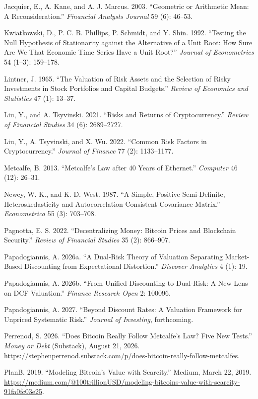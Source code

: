 \documentclass[12pt]{article}
\DeclareRobustCommand{\chg}[1]{{\color{blue}#1}}
\theoremstyle{plain}
\theoremstyle{remark}
\begin{document}
\chg{Jacquier, E., A. Kane, and A. J. Marcus. 2003. ``Geometric or Arithmetic Mean: A Reconsideration.'' \emph{Financial Analysts Journal} 59 (6): 46--53.}

\chg{Kwiatkowski, D., P. C. B. Phillips, P. Schmidt, and Y. Shin. 1992. ``Testing the Null Hypothesis of Stationarity against the Alternative of a Unit Root: How Sure Are We That Economic Time Series Have a Unit Root?'' \emph{Journal of Econometrics} 54 (1--3): 159--178.}

Lintner, J. 1965. ``The Valuation of Risk Assets and the Selection of Risky Investments in Stock Portfolios and Capital Budgets.'' \emph{Review of Economics and Statistics} 47 (1): 13--37.

\chg{Liu, Y., and A. Tsyvinski. 2021. ``Risks and Returns of Cryptocurrency.'' \emph{Review of Financial Studies} 34 (6): 2689--2727.}

\chg{Liu, Y., A. Tsyvinski, and X. Wu. 2022. ``Common Risk Factors in Cryptocurrency.'' \emph{Journal of Finance} 77 (2): 1133--1177.}

\chg{Metcalfe, B. 2013. ``Metcalfe's Law after 40 Years of Ethernet.'' \emph{Computer} 46 (12): 26--31.}

\chg{Newey, W. K., and K. D. West. 1987. ``A Simple, Positive Semi-Definite, Heteroskedasticity and Autocorrelation Consistent Covariance Matrix.'' \emph{Econometrica} 55 (3): 703--708.}

\chg{Pagnotta, E. S. 2022. ``Decentralizing Money: Bitcoin Prices and Blockchain Security.'' \emph{Review of Financial Studies} 35 (2): 866--907.}

\chg{Papadogiannis, A. 2026a. ``A Dual-Risk Theory of Valuation Separating Market-Based Discounting from Expectational Distortion.'' \emph{Discover Analytics} 4 (1): 19.}

Papadogiannis, A. 2026b. ``From Unified Discounting to Dual-Risk: A New Lens on DCF Valuation.'' \emph{Finance Research Open} 2: 100096.

\chg{Papadogiannis, A. 2027. ``Beyond Discount Rates: A Valuation Framework for Unpriced Systematic Risk.'' \emph{Journal of Investing}, forthcoming.}

\chg{Perrenod, S. 2026. ``Does Bitcoin Really Follow Metcalfe's Law? Five New Tests.'' \emph{Money or Debt} (Substack), August 21, 2026. \url{https://stephenperrenod.substack.com/p/does-bitcoin-really-follow-metcalfes}.}

\chg{PlanB. 2019. ``Modeling Bitcoin's Value with Scarcity.'' Medium, March 22, 2019. \url{https://medium.com/@100trillionUSD/modeling-bitcoins-value-with-scarcity-91fa0fc03e25}.}
\end{document}
